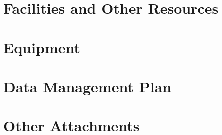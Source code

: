 \documentclass[11pt]{article}
\begin{document}
\thispagestyle{empty}
\AddToShipoutPicture*{\BackgroundPic}


\clearpage
{}

\thispagestyle{fancy}
\setlength{\headheight}{19.7478pt}
\newlength{\nsfoffset}
\setlength{\nsfoffset}{\headheight}
\addtolength{\nsfoffset}{\baselineskip}



\appendix




\clearpage




\clearpage


\clearpage

\section{Facilities and Other Resources}\label{sec:facilities}


\section{Equipment}\label{sec:equipment}


\section{Data Management Plan}\label{sec:dataplan}


\section{Other Attachments}\label{sec:other}

\end{document}
